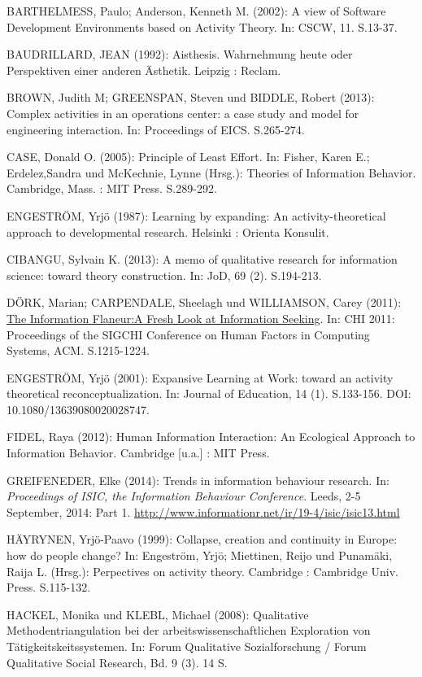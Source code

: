 \documentclass[a4paper,
fontsize=11pt,
oneside,
numbers=noperiodatend,
parskip=half-,
bibliography=totoc,
final
]{scrartcl}
\begin{document}
BARTHELMESS, Paulo; Anderson, Kenneth M. (2002): A view of Software
Development Environments based on Activity Theory. In: CSCW, 11.
S.13-37.

BAUDRILLARD, JEAN (1992): Aisthesis. Wahrnehmung heute oder Perspektiven
einer anderen Ästhetik. Leipzig : Reclam.

BROWN, Judith M; GREENSPAN, Steven und BIDDLE, Robert (2013): Complex
activities in an operations center: a case study and model for
engineering interaction. In: Proceedings of EICS. S.265-274.

CASE, Donald O. (2005): Principle of Least Effort. In: Fisher, Karen E.;
Erdelez,Sandra und McKechnie, Lynne (Hrsg.): Theories of Information
Behavior. Cambridge, Mass. : MIT Press. S.289-292.

ENGESTRÖM, Yrjö (1987): Learning by expanding: An activity-theoretical
approach to developmental research. Helsinki : Orienta Konsulit.

CIBANGU, Sylvain K. (2013): A memo of qualitative research for
information science: toward theory construction. In: JoD, 69 (2).
S.194-213.

DÖRK, Marian; CARPENDALE, Sheelagh und WILLIAMSON, Carey (2011):
\href{http://mariandoerk.de/informationflaneur/chi2011.pdf}{The
Information
Flaneur:}\href{http://mariandoerk.de/informationflaneur/chi2011.pdf}{A
Fresh Look at Information Seeking}. In: CHI 2011: Proceedings of the
SIGCHI Conference on Human Factors in Computing Systems, ACM.
S.1215-1224.

ENGESTRÖM, Yrjö (2001): Expansive Learning at Work: toward an activity
theoretical reconceptualization. In: Journal of Education, 14 (1).
S.133-156. DOI: 10.1080/13639080020028747.

FIDEL, Raya (2012): Human Information Interaction: An Ecological
Approach to Information Behavior. Cambridge {[}u.a.{]} : MIT Press.

GREIFENEDER, Elke (2014): Trends in information behaviour research. In:
\emph{Proceedings of ISIC, the Information Behaviour Conference}. Leeds,
2-5 September, 2014: Part 1.
\url{http://www.informationr.net/ir/19-4/isic/isic13.html}

HÄYRYNEN, Yrjö-Paavo (1999): Collapse, creation and continuity in
Europe: how do people change? In: Engeström, Yrjö; Miettinen, Reijo und
Punamäki, Raija L. (Hrsg.): Perpectives on activity theory. Cambridge :
Cambridge Univ. Press. S.115-132.

HACKEL, Monika und KLEBL, Michael (2008): Qualitative
Methodentriangulation bei der arbeitswissenschaftlichen Exploration von
Tätigkeitskeitssystemen. In: Forum Qualitative Sozialforschung / Forum
Qualitative Social Research, Bd. 9 (3). 14 S.
\end{document}
